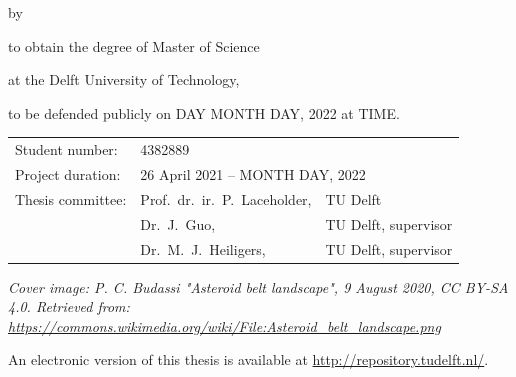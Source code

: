 \begin{titlepage}


\begin{center}


{\makeatletter
\largetitlestyle\fontsize{36}{48}\selectfont\@title
\makeatother}

{\makeatletter
\ifx\@subtitle\undefined\else
    \bigskip
   {\tudsffamily\fontsize{22}{32}\selectfont\@subtitle}    
\fi
\makeatother}

\bigskip
\bigskip

by

\bigskip
\bigskip

{\makeatletter
\largetitlestyle\fontsize{26}{26}\selectfont\@author
\makeatother}

\bigskip
\bigskip

to obtain the degree of Master of Science

at the Delft University of Technology,

to be defended publicly on DAY MONTH DAY, 2022 at TIME.

\vfill

\begin{tabular}{lll}
    Student number: & 4382889 \\
    Project duration: & \multicolumn{2}{l}{26 April 2021 -- MONTH DAY, 2022} \\
    Thesis committee: & Prof.\ dr.\ ir.\ P.\ Laceholder, & TU Delft \\
        & Dr.\ J.\ Guo, & TU Delft, supervisor \\
        & Dr.\ M.\ J.\ Heiligers, & TU Delft, supervisor
\end{tabular}

\bigskip
\bigskip
\emph{Cover image: P. C. Budassi "Asteroid belt landscape", 9 August 2020, CC BY-SA 4.0. Retrieved from: \url{https://commons.wikimedia.org/wiki/File:Asteroid_belt_landscape.png}}

\bigskip
\bigskip
An electronic version of this thesis is available at \url{http://repository.tudelft.nl/}.


\end{center}
\end{titlepage}
